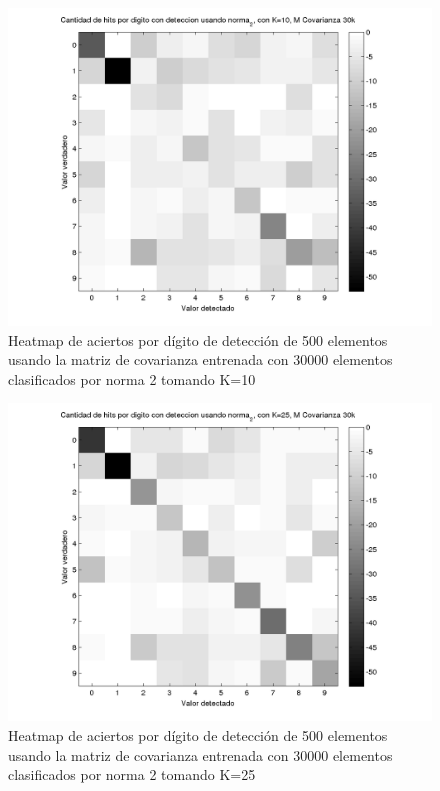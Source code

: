 \begin{figure}[H]
\includegraphics[width=\hmwidth]{plots/heatmap-30kcv-k10-norma_2.png}
\caption{Heatmap de aciertos por d\'igito de detecci\'on de 500 elementos usando la matriz de covarianza entrenada con 30000 elementos
clasificados por norma 2 tomando K=10 }
\label{fig:HM30kcv-k10}
\end{figure}

\begin{figure}[H]
\includegraphics[width=\hmwidth]{plots/heatmap-30kcv-k25-norma_2.png}
\caption{Heatmap de aciertos por d\'igito de detecci\'on de 500 elementos usando la matriz de covarianza entrenada con 30000 elementos
clasificados por norma 2 tomando K=25 }
\label{fig:HM30kcv-k25}
\end{figure}

